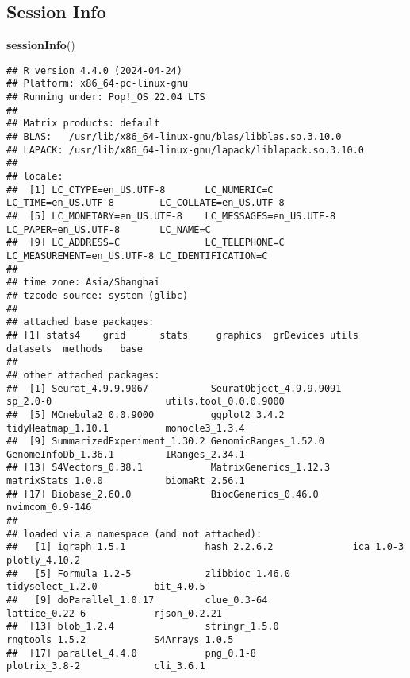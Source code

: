\documentclass[
]{article}
\newenvironment{Shaded}{\begin{snugshade}}{\end{snugshade}}
\newcommand{\KeywordTok}[1]{\textcolor[rgb]{0.13,0.29,0.53}{\textbf{#1}}}
\newcommand{\NormalTok}[1]{#1}
\begin{document}
\hypertarget{session}{%
\subsection{Session Info}\label{session}}

\begin{Shaded}
\begin{Highlighting}[]
\KeywordTok{sessionInfo}\NormalTok{()}
\end{Highlighting}
\end{Shaded}

\begin{verbatim}
## R version 4.4.0 (2024-04-24)
## Platform: x86_64-pc-linux-gnu
## Running under: Pop!_OS 22.04 LTS
## 
## Matrix products: default
## BLAS:   /usr/lib/x86_64-linux-gnu/blas/libblas.so.3.10.0 
## LAPACK: /usr/lib/x86_64-linux-gnu/lapack/liblapack.so.3.10.0
## 
## locale:
##  [1] LC_CTYPE=en_US.UTF-8       LC_NUMERIC=C               LC_TIME=en_US.UTF-8        LC_COLLATE=en_US.UTF-8    
##  [5] LC_MONETARY=en_US.UTF-8    LC_MESSAGES=en_US.UTF-8    LC_PAPER=en_US.UTF-8       LC_NAME=C                 
##  [9] LC_ADDRESS=C               LC_TELEPHONE=C             LC_MEASUREMENT=en_US.UTF-8 LC_IDENTIFICATION=C       
## 
## time zone: Asia/Shanghai
## tzcode source: system (glibc)
## 
## attached base packages:
## [1] stats4    grid      stats     graphics  grDevices utils     datasets  methods   base     
## 
## other attached packages:
##  [1] Seurat_4.9.9.9067           SeuratObject_4.9.9.9091     sp_2.0-0                    utils.tool_0.0.0.9000      
##  [5] MCnebula2_0.0.9000          ggplot2_3.4.2               tidyHeatmap_1.10.1          monocle3_1.3.4             
##  [9] SummarizedExperiment_1.30.2 GenomicRanges_1.52.0        GenomeInfoDb_1.36.1         IRanges_2.34.1             
## [13] S4Vectors_0.38.1            MatrixGenerics_1.12.3       matrixStats_1.0.0           biomaRt_2.56.1             
## [17] Biobase_2.60.0              BiocGenerics_0.46.0         nvimcom_0.9-146            
## 
## loaded via a namespace (and not attached):
##   [1] igraph_1.5.1              hash_2.2.6.2              ica_1.0-3                 plotly_4.10.2            
##   [5] Formula_1.2-5             zlibbioc_1.46.0           tidyselect_1.2.0          bit_4.0.5                
##   [9] doParallel_1.0.17         clue_0.3-64               lattice_0.22-6            rjson_0.2.21             
##  [13] blob_1.2.4                stringr_1.5.0             rngtools_1.5.2            S4Arrays_1.0.5           
##  [17] parallel_4.4.0            png_0.1-8                 plotrix_3.8-2             cli_3.6.1                

\end{verbatim}
\end{document}
